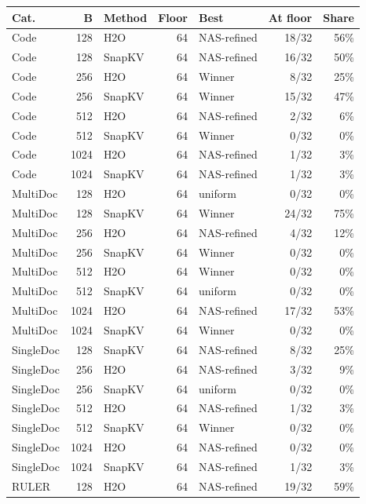 \begin{table}[t]
  \centering
  \scriptsize
  \setlength{\tabcolsep}{3pt}
  \begin{tabular}{@{}l r l r l r r@{}}
    \toprule
    Cat. & B & Method & Floor & Best & At floor & Share \\
    \midrule
    Code & 128 & H2O & 64 & NAS-refined & 18/32 & 56\% \\
    Code & 128 & SnapKV & 64 & NAS-refined & 16/32 & 50\% \\
    Code & 256 & H2O & 64 & Winner & 8/32 & 25\% \\
    Code & 256 & SnapKV & 64 & Winner & 15/32 & 47\% \\
    Code & 512 & H2O & 64 & NAS-refined & 2/32 & 6\% \\
    Code & 512 & SnapKV & 64 & Winner & 0/32 & 0\% \\
    Code & 1024 & H2O & 64 & NAS-refined & 1/32 & 3\% \\
    Code & 1024 & SnapKV & 64 & NAS-refined & 1/32 & 3\% \\
    MultiDoc & 128 & H2O & 64 & uniform & 0/32 & 0\% \\
    MultiDoc & 128 & SnapKV & 64 & Winner & 24/32 & 75\% \\
    MultiDoc & 256 & H2O & 64 & NAS-refined & 4/32 & 12\% \\
    MultiDoc & 256 & SnapKV & 64 & Winner & 0/32 & 0\% \\
    MultiDoc & 512 & H2O & 64 & Winner & 0/32 & 0\% \\
    MultiDoc & 512 & SnapKV & 64 & uniform & 0/32 & 0\% \\
    MultiDoc & 1024 & H2O & 64 & NAS-refined & 17/32 & 53\% \\
    MultiDoc & 1024 & SnapKV & 64 & Winner & 0/32 & 0\% \\
    SingleDoc & 128 & SnapKV & 64 & NAS-refined & 8/32 & 25\% \\
    SingleDoc & 256 & H2O & 64 & NAS-refined & 3/32 & 9\% \\
    SingleDoc & 256 & SnapKV & 64 & uniform & 0/32 & 0\% \\
    SingleDoc & 512 & H2O & 64 & NAS-refined & 1/32 & 3\% \\
    SingleDoc & 512 & SnapKV & 64 & Winner & 0/32 & 0\% \\
    SingleDoc & 1024 & H2O & 64 & NAS-refined & 0/32 & 0\% \\
    SingleDoc & 1024 & SnapKV & 64 & NAS-refined & 1/32 & 3\% \\
    RULER & 128 & H2O & 64 & NAS-refined & 19/32 & 59\% \\

\end{tabular}
\end{table}
